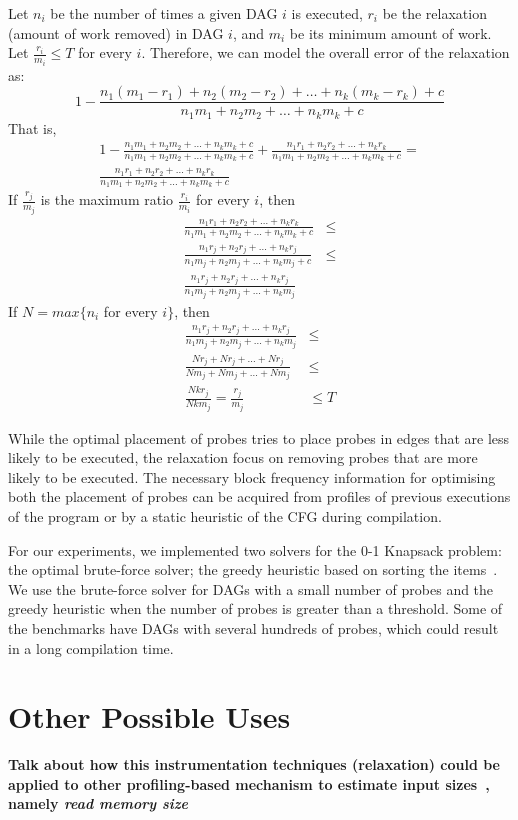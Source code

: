 Let $n_i$ be the number of times a given DAG $i$ is executed, $r_i$ be the relaxation (amount of work removed) in DAG $i$, and $m_i$ be its minimum amount of work.
Let $\frac{r_i}{m_i} \leq T$ for every $i$.
Therefore, we can model the overall error of the relaxation as:
\[
1 - \frac{n_1(m_1 - r_1) + n_2(m_2 - r_2) + \ldots + n_k(m_k - r_k) + c}{n_1m_1 + n_2m_2 + \ldots + n_km_k + c}
\]
That is,
\begin{gather*}
 1 - \frac{n_1m_1 + n_2m_2 + \ldots + n_km_k + c}{n_1m_1 + n_2m_2 + \ldots + n_km_k + c} + \frac{n_1r_1 + n_2r_2 + \ldots + n_kr_k}{n_1m_1 + n_2m_2 + \ldots + n_km_k + c} = \\
 \frac{n_1r_1 + n_2r_2 + \ldots + n_kr_k}{n_1m_1 + n_2m_2 + \ldots + n_km_k + c}
\end{gather*}
If $\frac{r_j}{m_j}$ is the maximum ratio $\frac{r_i}{m_i}$ for every $i$, then
\begin{equation*}
\begin{aligned}
 \frac{n_1r_1 + n_2r_2 + \ldots + n_kr_k}{n_1m_1 + n_2m_2 + \ldots + n_km_k + c} &\leq\\
 \frac{n_1r_j + n_2r_j + \ldots + n_kr_j}{n_1m_j + n_2m_j + \ldots + n_km_j + c} &\leq\\
 \frac{n_1r_j + n_2r_j + \ldots + n_kr_j}{n_1m_j + n_2m_j + \ldots + n_km_j} & 
\end{aligned}
\end{equation*}
If $N = max\{n_i$ for every $i\}$, then
\begin{equation*}
\begin{aligned}
 \frac{n_1r_j + n_2r_j + \ldots + n_kr_j}{n_1m_j + n_2m_j + \ldots + n_km_j} &\leq\\
 \frac{Nr_j + Nr_j + \ldots + Nr_j}{Nm_j + Nm_j + \ldots + Nm_j} &\leq\\
 \frac{Nkr_j}{Nkm_j} = \frac{r_j}{m_j} &\leq T
\end{aligned}
\end{equation*}

While the optimal placement of probes tries to place probes in edges that are less likely to be executed, the relaxation focus on removing probes that are more likely to be executed.
The necessary block frequency information for optimising both the placement of probes can be acquired from profiles of previous executions of the program or by a static heuristic of the CFG during compilation.

For our experiments, we implemented two solvers for the 0-1 Knapsack problem:
the optimal brute-force solver;
the greedy heuristic based on sorting the items~\citep{dantzig57}.
We use the brute-force solver for DAGs with a small number of probes and the greedy heuristic when the number of probes is greater than a threshold.
Some of the benchmarks have DAGs with several hundreds of probes, which could result in a long compilation time.

\section{Other Possible Uses}

\textbf{Talk about how this instrumentation techniques (relaxation) could be applied to other profiling-based mechanism to estimate input sizes~\citep{zaparanuks12,coppa14}, namely \textit{read memory size}}
